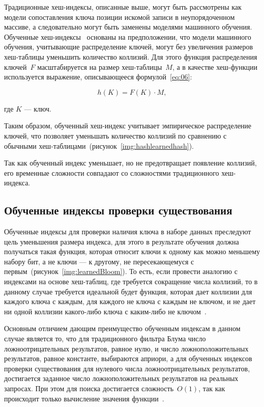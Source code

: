 Традиционные хеш-индексы, описанные выше, могут быть рассмотрены как модели
сопоставления ключа позиции искомой записи в неупорядоченном массиве, а
следовательно могут быть заменены моделями машинного обучения.  Обученные
хеш-индексы~\cite{main} основаны на предположении, что модели машинного
обучения, учитывающие распределение ключей, могут без увеличения размеров
хеш-таблицы уменьшить количество коллизий. Для этого функция распределения
ключей~$F$ масштабируется на размер хеш-таблицы~$M$, а в качестве хеш-функции
используется выражение, описывающееся формулой~\eqref{eq:06}:

\begin{equation}\label{eq:06}
    h(K) = F(K) \cdot M,
\end{equation}

где $K$ --- ключ.

Таким образом, обученный хеш-индекс учитывает эмпирическое распределение ключей,
что позволяет уменьшать количество коллизий по сравнению с обычными
хеш-таблицами~(рисунок~\ref{img:hashlearnedhash}).


Так как обученный индекс уменьшает, но не предотвращает появление коллизий, его
временные сложности совпадают со сложностями традиционного хеш-индекса.

\subsection{Обученные индексы проверки существования}

Обученные индексы для проверки наличия ключа в наборе данных преследуют цель
уменьшения размера индекса, для этого в результате обучения должна получаться
такая функция, которая относит ключи к одному как можно меньшему набору бит, а
не ключи --- к другому, не пересекающемуся с
первым~(рисунок~\ref{img:learnedBloom}). То
есть, если провести аналогию с индексами на основе хеш-таблиц, где требуется
сокращение числа коллизий, то в данному случае требуется идеальной будет
функция, которая дает коллизии для каждого ключа с каждым, для каждого не ключа
с каждым не ключом, и не дает ни одной коллизии какого-либо ключа с каким-либо
не ключом~\cite{main}.

Основным отличием дающим преимущество обученным индексам в данном случае
является то, что для традиционного фильтра Блума число ложноотрицательных
результатов, равное нулю, и число ложноположительных результатов, равное
константе, выбираются априори, а для обученных индексов проверки существования
для нулевого числа ложноотрицательных результатов, достигается заданное число
ложноположительных результатов на реальных запросах. При этом для поиска
достигается сложность~$O(1)$, так как происходит только вычисление значения
функции~\cite{main}.

